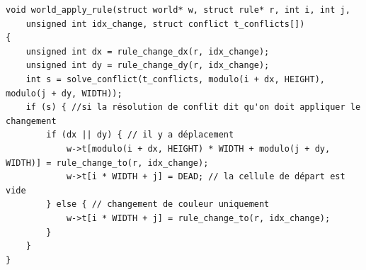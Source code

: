 \clearpage
\begin{lstlisting}
void world_apply_rule(struct world* w, struct rule* r, int i, int j,
    unsigned int idx_change, struct conflict t_conflicts[])
{
    unsigned int dx = rule_change_dx(r, idx_change);
    unsigned int dy = rule_change_dy(r, idx_change);
    int s = solve_conflict(t_conflicts, modulo(i + dx, HEIGHT), modulo(j + dy, WIDTH));
    if (s) { //si la résolution de conflit dit qu'on doit appliquer le changement
        if (dx || dy) { // il y a déplacement
            w->t[modulo(i + dx, HEIGHT) * WIDTH + modulo(j + dy, WIDTH)] = rule_change_to(r, idx_change);
            w->t[i * WIDTH + j] = DEAD; // la cellule de départ est vide
        } else { // changement de couleur uniquement
            w->t[i * WIDTH + j] = rule_change_to(r, idx_change);
        }
    }
}
\end{lstlisting}

